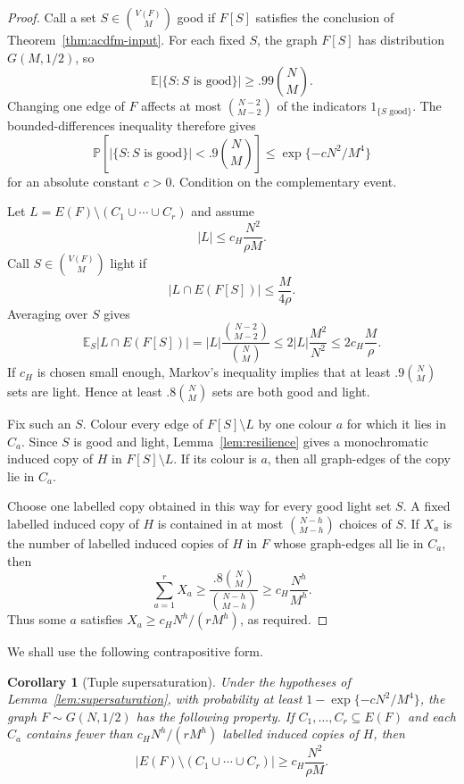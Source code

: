 \documentclass[11pt,reqno]{amsart}
\numberwithin{equation}{section}
\theoremstyle{plain}
\newtheorem{corollary}[theorem]{Corollary}
\theoremstyle{definition}
\newcommand{\Prb}{\mathbb P}
\newcommand{\E}{\mathbb E}
\begin{document}
\begin{proof}
Call a set $S\in\binom{V(F)}M$ good if $F[S]$ satisfies the conclusion of
Theorem~\ref{thm:acdfm-input}.  For each fixed $S$, the graph $F[S]$ has
distribution $G(M,1/2)$, so
$$
        \E |\{S:S\text{ is good}\}|
        \ge .99\binom NM.
$$
Changing one edge of $F$ affects at most $\binom{N-2}{M-2}$ of the
indicators $1_{\{S\text{ good}\}}$.  The bounded-differences inequality
therefore gives
$$
        \Prb\left[|\{S:S\text{ is good}\}|<.9\binom NM\right]
        \le \exp\{-cN^2/M^4\}
$$
for an absolute constant $c>0$.  Condition on the complementary event.

Let $L=E(F)\setminus(C_1\cup\cdots\cup C_r)$ and assume
$$
        |L|\le c_H\frac{N^2}{\rho M}.
$$
Call $S\in\binom{V(F)}M$ light if
$$
        |L\cap E(F[S])|\le \frac{M}{4\rho}.
$$
Averaging over $S$ gives
$$
        \E_S |L\cap E(F[S])|
        = |L|\frac{\binom{N-2}{M-2}}{\binom NM}
        \le 2|L|\frac{M^2}{N^2}
        \le 2c_H\frac{M}{\rho}.
$$
If $c_H$ is chosen small enough, Markov's inequality
implies that at least $.9\binom NM$ sets are light.  Hence at least
$.8\binom NM$ sets are both good and light.

Fix such an $S$.  Colour every edge of $F[S]\setminus L$ by one colour
$a$ for which it lies in $C_a$.  Since $S$ is good and light,
Lemma~\ref{lem:resilience} gives a monochromatic induced copy of $H$ in
$F[S]\setminus L$.  If its colour is $a$, then all graph-edges of the copy
lie in $C_a$.

Choose one labelled copy obtained in this way for every good light set $S$.
A fixed labelled induced copy of $H$ is contained in at most
$\binom{N-h}{M-h}$ choices of $S$.  If $X_a$ is the number of labelled
induced copies of $H$ in $F$ whose graph-edges all lie in $C_a$, then
$$
        \sum_{a=1}^r X_a
        \ge
        \frac{.8\binom NM}{\binom{N-h}{M-h}}
        \ge c_H\frac{N^h}{M^h}.
$$
Thus some $a$ satisfies $X_a\ge c_HN^h/(rM^h)$, as required.
\end{proof}

We shall use the following contrapositive form.

\begin{corollary}[Tuple supersaturation]
\label{cor:tuple-supersaturation}
Under the hypotheses of Lemma~\ref{lem:supersaturation}, with probability at least
$1-\exp\{-cN^2/M^4\}$, the graph $F\sim G(N,1/2)$ has the following
property.  If $C_1,
\ldots,C_r\subseteq E(F)$ and each $C_a$ contains fewer than
$c_HN^h/(rM^h)$ labelled induced copies of $H$, then
$$
        |E(F)\setminus(C_1\cup\cdots\cup C_r)|
        \ge c_H\frac{N^2}{\rho M}.
$$
\end{corollary}
\end{document}
